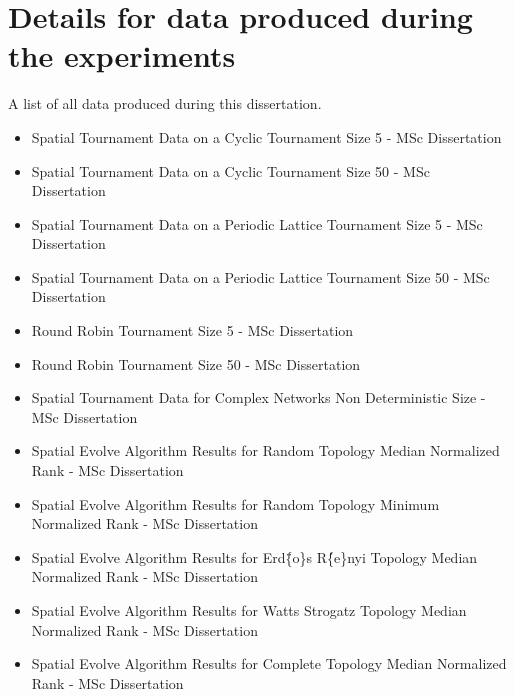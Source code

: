 \section{Details for data produced during the experiments}
\label{append:data}
A list of all data produced during this dissertation.
\begin{itemize}
  \item Spatial Tournament Data on a Cyclic Tournament Size 5 - MSc Dissertation~\cite{glynatsi_nikoleta_2016_61264}
  \item Spatial Tournament Data on a Cyclic Tournament Size 50 - MSc Dissertation~\cite{}
  \item Spatial Tournament Data on a Periodic Lattice Tournament Size 5 - MSc Dissertation
  \item Spatial Tournament Data on a Periodic Lattice Tournament Size 50 - MSc Dissertation
  \item Round Robin Tournament Size 5 - MSc Dissertation
  \item Round Robin Tournament Size 50 - MSc Dissertation
  \item Spatial Tournament Data for Complex Networks Non Deterministic Size - MSc Dissertation
  \item Spatial Evolve Algorithm Results for Random Topology Median Normalized Rank - MSc Dissertation
  \item Spatial Evolve Algorithm Results for Random Topology Minimum Normalized Rank - MSc Dissertation 
  \item Spatial Evolve Algorithm Results for Erd\"\{o\}s R\'\{e\}nyi Topology Median Normalized Rank - MSc Dissertation
  \item Spatial Evolve Algorithm Results for Watts Strogatz Topology Median Normalized Rank - MSc Dissertation
  \item Spatial Evolve Algorithm Results for Complete Topology Median Normalized Rank - MSc Dissertation
\end{itemize}
